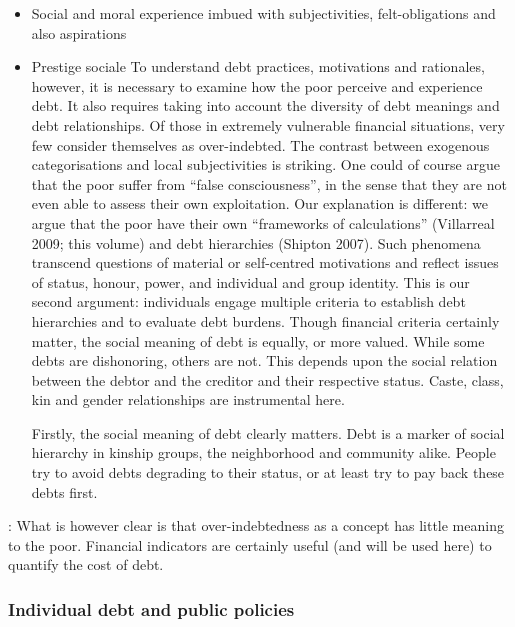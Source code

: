 \documentclass[a4paper, 11pt, onecolumn]{article}
\begin{document}
\begin{itemize}
\item Social and moral experience
imbued with subjectivities, felt-obligations and also aspirations

\item Prestige sociale
\cite{Guerin2014a}
To understand debt practices, motivations and rationales, however, it is necessary to examine
how the poor perceive and experience debt. It also requires taking into account the diversity
of debt meanings and debt relationships. Of those in extremely vulnerable financial situations,
very few consider themselves as over-indebted. The contrast between exogenous
categorisations and local subjectivities is striking. One could of course argue that the poor
suffer from “false consciousness”, in the sense that they are not even able to assess their own
exploitation. Our explanation is different: we argue that the poor have their own “frameworks
of calculations” (Villarreal 2009; this volume) and debt hierarchies (Shipton 2007). Such
phenomena transcend questions of material or self-centred motivations and reflect issues of
status, honour, power, and individual and group identity. This is our second argument:
individuals engage multiple criteria to establish debt hierarchies and to evaluate debt burdens.
Though financial criteria certainly matter, the social meaning of debt is equally, or more
valued. While some debts are dishonoring, others are not. This depends upon the social
relation between the debtor and the creditor and their respective status. Caste, class, kin and
gender relationships are instrumental here.

\cite{Guerin2014}
Firstly, the social meaning of debt clearly matters. Debt is a marker of social hierarchy in
kinship groups, the neighborhood and community alike. People try to avoid debts degrading
to their status, or at least try to pay back these debts first.

\end{itemize}


\cite{Guerin2014a} : What is however clear is that over-indebtedness as a concept has little meaning to the poor.
Financial indicators are certainly useful (and will be used here) to quantify the cost of debt.




	\subsubsection{Individual debt and public policies}
\end{document}
